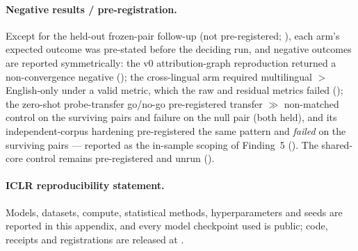 \paragraph{Negative results / pre-registration.}
Except for the held-out frozen-pair follow-up (not pre-registered; ), each
arm's expected outcome was pre-stated before the deciding run, and negative outcomes
are reported symmetrically: the v0 attribution-graph reproduction returned a
non-convergence negative (); the cross-lingual arm required
multilingual $>$ English-only under a valid metric, which the raw and residual metrics
failed (); the zero-shot
probe-transfer go/no-go pre-registered transfer $\gg$ non-matched control on the surviving pairs
and failure on the null pair (both held), and its independent-corpus hardening
pre-registered the same pattern and \emph{failed} on the surviving pairs --- reported as the
in-sample scoping of Finding~5 (). The shared-core control remains
pre-registered and unrun ().

\paragraph{ICLR reproducibility statement.} Models, datasets, compute, statistical methods,
hyperparameters and seeds are reported in this appendix, and every model checkpoint used is
public; code, receipts and registrations are released at \coderepo.


